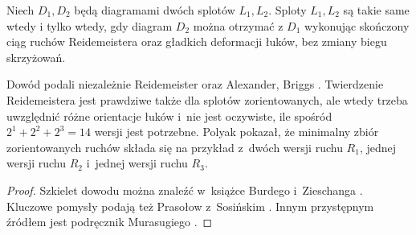 \begin{theorem}[Reidemeister, 1927]
\label{thm:reidemeister}%
%
%
    Niech $D_1, D_2$ będą diagramami dwóch splotów $L_1, L_2$.
    Sploty $L_1, L_2$ są takie same wtedy i tylko wtedy, gdy diagram $D_2$ można otrzymać z $D_1$ wykonując skończony ciąg ruchów Reidemeistera oraz gładkich deformacji łuków, bez zmiany biegu skrzyżowań.
\end{theorem}

Dowód podali niezależnie Reidemeister \cite{reidemeister27} oraz Alexander, Briggs \cite{briggs27}.
%
%
%
Twierdzenie Reidemeistera jest prawdziwe także dla splotów zorientowanych, ale wtedy trzeba uwzględnić różne orientacje łuków i~nie jest oczywiste, ile spośród $2^1 + 2^2 + 2^3 = 14$ wersji jest potrzebne.
Polyak \cite{polyak10} pokazał, że minimalny zbiór zorientowanych ruchów składa się na przykład z~dwóch wersji ruchu $R_1$, jednej wersji ruchu $R_2$ i~jednej wersji ruchu $R_3$.
%

\begin{proof}
%
%
%
%
%
    Szkielet dowodu można znaleźć w~książce Burdego i~Zieschanga \cite[s. 9-11]{burde14}.
    Kluczowe pomysły podają też Prasołow z~Sosińskim \cite[s. 11-12]{prasolov97}.
    Innym przystępnym źródłem jest podręcznik Murasugiego \cite[s. 50-56]{murasugi96}.
\end{proof}

